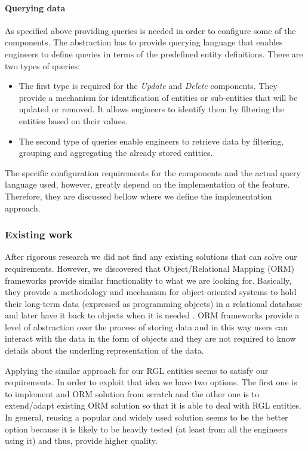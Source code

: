 \paragraph{Querying data}

As specified above providing queries is needed in order to configure some of the components. The abstraction has to provide querying language that enables engineers to define queries in terms of the predefined entity definitions. There are two types of queries:

\begin{itemize}
	\item The first type is required for the \textit{Update} and \textit{Delete} components. They provide a mechanism for identification of entities or sub-entities that will be updated or removed. It allows engineers to identify them by filtering the entities based on their values.
	
	\item The second type of queries enable engineers to retrieve data by filtering, grouping and aggregating the already stored entities.
\end{itemize}

The specific configuration requirements for the components and the actual query language used, however, greatly depend on the implementation of the feature. Therefore, they are discussed bellow where we define the implementation approach.

\subsubsection{Existing work}

After rigorous research we did not find any existing solutions that can solve our requirements. However, we discovered that Object/Relational Mapping (ORM) frameworks provide similar functionality to what we are looking for. Basically, they provide a methodology and mechanism for object-oriented systems to hold their long-term data (expressed as programming objects) in a relational database and later have it back to objects when it is needed \cite{o2008object}. ORM frameworks provide a level of abstraction over the process of storing data and in this way users can interact with the data in the form of objects and they are not required to know details about the underling representation of the data. 

Applying the similar approach for our RGL entities seems to satisfy our requirements. In order to exploit that idea we have two options. The first one is to implement and ORM solution from scratch and the other one is to extend/adapt existing ORM solution so that it is able to deal with RGL entities. In general, reusing a popular and widely used solution seems to be the better option because it is likely to be heavily tested (at least from all the engineers using it) and thus, provide higher quality. 

